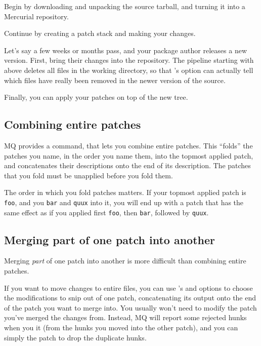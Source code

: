 Begin by downloading and unpacking the source tarball,
and turning it into a Mercurial repository.

Continue by creating a patch stack and making your changes.

Let's say a few weeks or months pass, and your package author releases
a new version.  First, bring their changes into the repository.
The pipeline starting with  above deletes all files in
the working directory, so that 's
 option can actually tell which files have
really been removed in the newer version of the source.

Finally, you can apply your patches on top of the new tree.

\subsection{Combining entire patches}
\label{sec:mq:combine}

MQ provides a command,  that lets you combine entire
patches.  This ``folds'' the patches you name, in the order you name
them, into the topmost applied patch, and concatenates their
descriptions onto the end of its description.  The patches that you
fold must be unapplied before you fold them.

The order in which you fold patches matters.  If your topmost applied
patch is \texttt{foo}, and you  \texttt{bar} and
\texttt{quux} into it, you will end up with a patch that has the same
effect as if you applied first \texttt{foo}, then \texttt{bar},
followed by \texttt{quux}.

\subsection{Merging part of one patch into another}

Merging \emph{part} of one patch into another is more difficult than
combining entire patches.

If you want to move changes to entire files, you can use
's  and
 options to choose the modifications to snip
out of one patch, concatenating its output onto the end of the patch
you want to merge into.  You usually won't need to modify the patch
you've merged the changes from.  Instead, MQ will report some rejected
hunks when you  it (from the hunks you moved into the
other patch), and you can simply  the patch to drop
the duplicate hunks.

